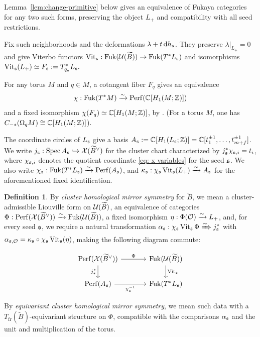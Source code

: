 \documentclass[12pt, letter]{amsart}
\theoremstyle{definition}
\newtheorem{definition}[theorem]{Definition}
\newcommand{\Z}{\mathbb Z}
\newcommand{\fr}{\mathrm{fr}}
\DeclareMathOperator{\Vit}{Vit}
\numberwithin{equation}{section}
\begin{document}
Lemma~\ref{lem:change-primitive} below gives an equivalence of Fukaya categories for any
two such forms, preserving the object $L_+$ and compatibility with all seed restrictions. 



Fix such neighborhoods and the deformations $\lambda+t\,\mathrm{d} h_{\mathfrak{s}}$.
They preserve $\lambda|_{L_+}=0$ and give Viterbo functors
$
 \Vit_{\fs}:\Fuk(\cU(\widetilde B))\to\Fuk(T^*L_{\fs})$ and isomorphisms $
 \Vit_{\fs}(L_+)\simeq F_{\fs}:=T^*_{q_{\fs}}L_{\fs}.
$



For any torus $M$ and $q\in M$, a cotangent fiber $F_q$ gives an equivalence
\[
\chi:\Fuk(T^*M)\xrightarrow{\sim}\Perf(\C[H_1(M;\Z)])
\]
and a fixed isomorphism 
 $\chi(F_q)\simeq\C[H_1(M;\Z)]$,
by \cite[Theorem~1.1]{Ab}. (For a torus $M$, one has 
$C_{-*}(\Omega_qM) \cong \C[H_1(M;\Z)]$).






The coordinate circles of $L_{\mathfrak{s}}$ give a basis
$
 A_{\fs}:=\C[H_1(L_{\fs};\Z)]
     =\C[t_1^{\pm1},\ldots,t_{m+f}^{\pm1}]$. 
We write 
$ j_{\mathfrak{s}}:\operatorname{Spec} A_{\mathfrak{s}}\hookrightarrow\mathcal{X}(\widetilde B^\vee)$ for the cluster chart characterized by 
$ j_{\mathfrak{s}}^*\chi_{\mathfrak{s},i}=t_i$, where  $\chi_{\mathfrak{s},i}$ denotes the quotient coordinate \eqref{eq: x variables} for the seed $\mathfrak{s}$. We also write $\chi_{\mathfrak{s}}: \operatorname{Fuk}(T^*L_{\mathfrak{s}}) \xrightarrow{\sim} \mathrm{Perf}( A_{\mathfrak{s}})$, and 
$
 \kappa_{\fs}:\chi_{\fs}\Vit_{\fs}(L_+)\xrightarrow{\sim}A_{\fs}
$ for the aforementioned fixed identification.


\begin{definition}\label{def: cms}
By \emph{cluster homological mirror symmetry} for $\widetilde B$, we mean a
cluster-admissible Liouville form
on $\mathcal{U}(\widetilde B)$, an equivalence of categories $ \Phi:\mathrm{Perf}(\mathcal{X}(\widetilde B^\vee))
\xrightarrow{\sim}\operatorname{Fuk}(\mathcal{U}(\widetilde B))$, a fixed isomorphism $ \eta:\Phi(\mathcal{O})\xrightarrow{\sim}L_+$, and, for every seed $\mathfrak{s}$, we require a natural transformation $\alpha_{\fs}:\chi_{\fs}\Vit_{\fs}\Phi\xRightarrow{\sim}j_{\fs}^*$ with $\alpha_{\fs,\cO}=\kappa_{\fs}\circ\chi_{\fs}\Vit_{\fs}(\eta)$, making the following diagram commute:

\begin{equation}\label{eq:cms}
\begin{tikzcd}[column sep=large]
 \Perf(\cX(\widetilde B^\vee))\arrow[r,"\Phi"]\arrow[d,"j_{\fs}^*"']
 &\Fuk(\cU(\widetilde B))\arrow[d,"\Vit_{\fs}"]\\
 \Perf(A_{\fs})\arrow[r,"\chi_{\fs}^{-1}"']&\Fuk(T^*L_{\fs})
\end{tikzcd}
\end{equation}

By \emph{equivariant cluster homological mirror symmetry}, we mean such data with a
$T_{\fr}(\widetilde B)$-equivariant structure on $\Phi$, compatible with
the comparisons $\alpha_{\mathfrak{s}}$ and the unit and multiplication of the torus.
\end{definition}
\end{document}
